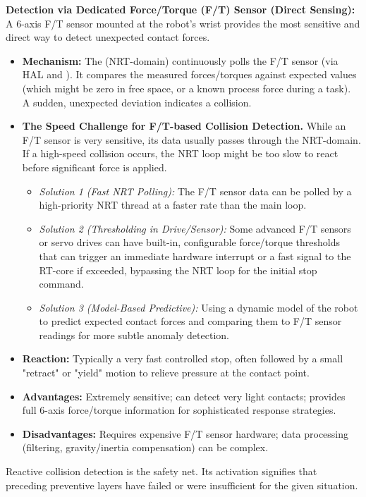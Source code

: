 \textbf{Detection via Dedicated Force/Torque (F/T) Sensor (Direct Sensing):}
    A 6-axis F/T sensor mounted at the robot's wrist provides the most sensitive and direct way to detect unexpected contact forces.
    \begin{itemize}
        \item \textbf{Mechanism:} The  (NRT-domain) continuously polls the F/T sensor (via HAL and ). It compares the measured forces/torques against expected values (which might be zero in free space, or a known process force during a task). A sudden, unexpected deviation indicates a collision.
        \item \textbf{The Speed Challenge for F/T-based Collision Detection.} While an F/T sensor is very sensitive, its data usually passes through the NRT-domain. If a high-speed collision occurs, the NRT loop might be too slow to react before significant force is applied.
            \begin{itemize}
                \item \textit{Solution 1 (Fast NRT Polling):} The F/T sensor data can be polled by a high-priority NRT thread at a faster rate than the main  loop.
                \item \textit{Solution 2 (Thresholding in Drive/Sensor):} Some advanced F/T sensors or servo drives can have built-in, configurable force/torque thresholds that can trigger an immediate hardware interrupt or a fast signal to the RT-core if exceeded, bypassing the NRT loop for the initial stop command.
                \item \textit{Solution 3 (Model-Based Predictive):} Using a dynamic model of the robot to predict expected contact forces and comparing them to F/T sensor readings for more subtle anomaly detection.
            \end{itemize}
        \item \textbf{Reaction:} Typically a very fast controlled stop, often followed by a small "retract" or "yield" motion to relieve pressure at the contact point.
        \item \textbf{Advantages:} Extremely sensitive; can detect very light contacts; provides full 6-axis force/torque information for sophisticated response strategies.
        \item \textbf{Disadvantages:} Requires expensive F/T sensor hardware; data processing (filtering, gravity/inertia compensation) can be complex.
    \end{itemize}
Reactive collision detection is the safety net. Its activation signifies that preceding preventive layers have failed or were insufficient for the given situation.

